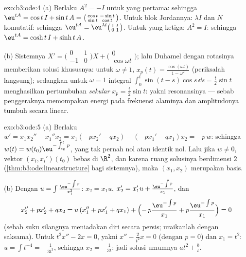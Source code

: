 \begin{solution}{exo:b3:ode:4}
(a) Berlaku $A^2 = -I$ untuk yang pertama: sehingga $\eu^{tA} = \cos t\,I + \sin
t\,A = \bigl(\begin{smallmatrix}\cos t & -\sin t\\ \sin t &
\cos t\end{smallmatrix}\bigr)$. Untuk blok Jordannya: $\lambda I$ dan
$N$ komutatif: sehingga $\eu^{tA} =
\eu^{\lambda t}\bigl(\begin{smallmatrix}1 & t\\ 0 &
1\end{smallmatrix}\bigr)$. Untuk yang ketiga: $A^2 = I$: sehingga $\eu^{tA} =
\cosh t\,I + \sinh t\,A$.

(b) Sistemnya $X' = \bigl(\begin{smallmatrix}0&1\\-1&0
\end{smallmatrix}\bigr)X + \bigl(\begin{smallmatrix}0\\
\cos\omega t\end{smallmatrix}\bigr)$; lalu Duhamel dengan
 rotasinya memberikan solusi khususnya: untuk
$\omega \neq 1$, $x_p(t) = \frac{\cos(\omega t)}{1 -
\omega^2}$ (periksalah langsung); sedangkan untuk $\omega = 1$ integral
$\int_0^t\sin(t - s)\cos s\,\dd s = \frac t2\sin t$ menghasilkan
pertumbuhan \emph{sekular} $x_p = \frac t2\sin t$: yakni resonansinya
--- sebab penggeraknya memompakan energi pada frekuensi alaminya dan
amplitudonya tumbuh secara linear.
\end{solution}

\begin{solution}{exo:b3:ode:5}
(a) Berlaku $w' = x_1x_2'' - x_1''x_2 = x_1(-px_2' - qx_2) - (-px_1'
- qx_1)x_2 = -p\,w$: sehingga $w(t) = w(t_0)\eu^{-\int_{t_0}^tp}$,
yang tak pernah nol atau identik nol. Lalu jika $w \neq 0$, vektor
$(x_i, x_i')(t_0)$ bebas di $\R^2$, dan karena
ruang solusinya berdimensi $2$
(\cref{thm:b3:ode:linearstructure} bagi sistemnya), maka $(x_1,
x_2)$ merupakan basis.

(b) Dengan $u = \int\frac{\eu^{-\int p}}{x_1^2}$: $x_2 = x_1u$,
$x_2' = x_1'u + \frac{\eu^{-\int p}}{x_1}$, dan
\[
x_2'' + px_2' + qx_2
= u\,(x_1'' + px_1' + qx_1) +
\Bigl(-\,p\frac{\eu^{-\int p}}{x_1} +
p\frac{\eu^{-\int p}}{x_1}\Bigr) = 0
\]
(sebab suku silangnya meniadakan diri secara persis; uraikanlah dengan saksama). Untuk
$t^2x'' - 2x = 0$, yakni $x'' - \frac2{t^2}x = 0$ (dengan $p = 0$)
dan $x_1 = t^2$: $u = \int t^{-4} = -\frac1{3t^3}$, sehingga $x_2
= -\frac1{3t}$: jadi solusi umumnya $at^2 + \frac bt$.
\end{solution}

